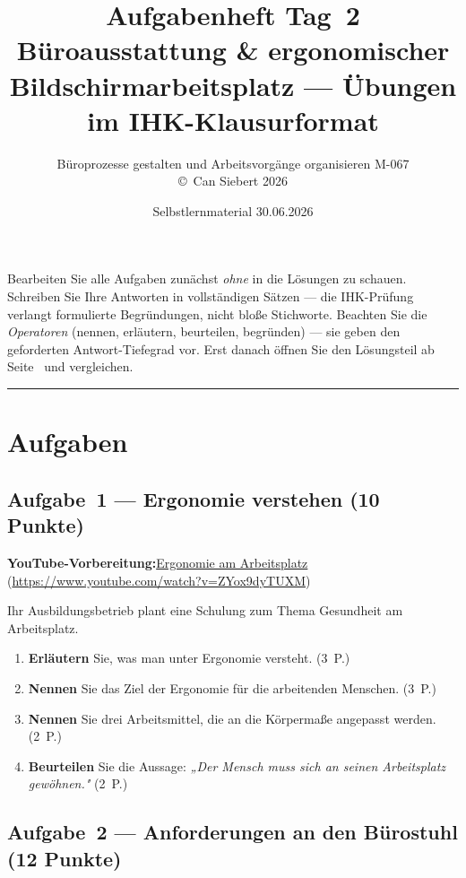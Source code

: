 \documentclass[11pt, a4paper]{article}
\title{\vspace*{-1.5cm}\Huge\bfseries\color{bfwPrimaryDark}Aufgabenheft Tag~2\\[0.4em]
  \large\color{bfwInkSoft}\textnormal{Büroausstattung \& ergonomischer Bildschirmarbeitsplatz --- Übungen im IHK-Klausurformat}}
\author{\textsf{Büroprozesse gestalten und Arbeitsvorgänge organisieren \textperiodcentered{} M-067}\\
\textsf{\small\copyright\ Can Siebert\,\textperiodcentered\,2026}}
\date{Selbstlernmaterial \textperiodcentered{} 30.06.2026}
\begin{document}
\maketitle
\thispagestyle{empty}

\begin{merksatz}[title={\bfseries So nutzen Sie dieses Aufgabenheft}]
Bearbeiten Sie alle Aufgaben zunächst \emph{ohne} in die Lösungen zu schauen. Schreiben
Sie Ihre Antworten in vollständigen Sätzen --- die IHK-Prüfung verlangt formulierte
Begründungen, nicht bloße Stichworte. Beachten Sie die \emph{Operatoren} (nennen,
erläutern, beurteilen, begründen) --- sie geben den geforderten Antwort-Tiefegrad vor.
Erst danach öffnen Sie den Lösungsteil ab Seite~\pageref{loesungen} und vergleichen.
\end{merksatz}

\tableofcontents
\vspace{1em}
\hrule

\section{Aufgaben}

\subsection*{Aufgabe~1 --- Ergonomie verstehen (10 Punkte)}

\noindent\textbf{\color{bfwAccent}YouTube-Vorbereitung:}\enspace \href{https://www.youtube.com/watch?v=ZYox9dyTUXM}{Ergonomie am Arbeitsplatz} (\url{https://www.youtube.com/watch?v=ZYox9dyTUXM})

\medskip
Ihr Ausbildungsbetrieb plant eine Schulung zum Thema Gesundheit am Arbeitsplatz.

\begin{enumerate}[label=(\alph*)]
  \item \textbf{Erläutern} Sie, was man unter Ergonomie versteht. \hfill (3~P.)
  \item \textbf{Nennen} Sie das Ziel der Ergonomie für die arbeitenden Menschen. \hfill (3~P.)
  \item \textbf{Nennen} Sie drei Arbeitsmittel, die an die Körpermaße angepasst werden. \hfill (2~P.)
  \item \textbf{Beurteilen} Sie die Aussage: \emph{„Der Mensch muss sich an seinen Arbeitsplatz gewöhnen."} \hfill (2~P.)
\end{enumerate}

\subsection*{Aufgabe~2 --- Anforderungen an den Bürostuhl (12 Punkte)}
\end{document}
